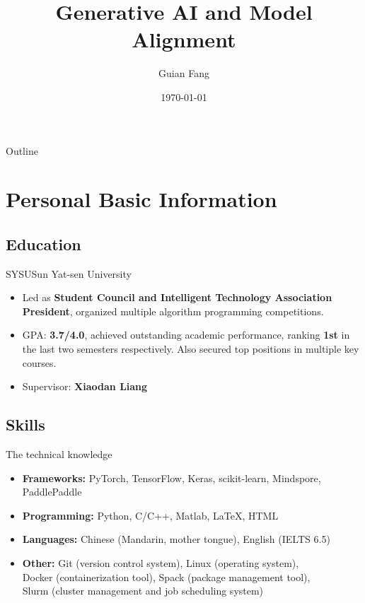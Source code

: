 \documentclass[8pt]{beamer}
\title[National University of Singapore]{\textbf{Generative AI and Model Alignment}}
\author[Guian Fang]{Guian Fang}
\institute[fanggan@mail2.sysu.edu.cn]{National University of Singapore}
\date[ECE interview]{\today}
\begin{document}
\frame{\titlepage}

\begin{frame}{Outline}
  \tableofcontents
\end{frame}
\section{Personal Basic Information}

\subsection{Education}
\begin{frame}{SYSU}{Sun Yat-sen University}
  \begin{itemize}
  \item {
    Led as \textbf{Student Council and Intelligent Technology Association President}, organized multiple algorithm programming competitions.
  }
  \item {
    GPA: \textbf{3.7/4.0}, achieved outstanding academic performance, ranking \textbf{1st} in the last two semesters respectively. Also secured top positions in multiple key courses.
  }
  \item {Supervisor: \textbf{Xiaodan Liang}}
  \end{itemize}
\end{frame}

\subsection{Skills}
\begin{frame}{The technical knowledge}
  \begin{itemize}
  \item
    \textbf{Frameworks:} %
    {PyTorch, TensorFlow, Keras, scikit-learn, Mindspore, PaddlePaddle} %


  \item
    \textbf{Programming:} %
    {Python, C/C++, Matlab, LaTeX, HTML} %

  \item
    \textbf{Languages:} %
    {Chinese (Mandarin, mother tongue), English (IELTS 6.5)} %

      \item
    \textbf{Other:} %
    {Git (version control system), Linux (operating system),\\ Docker (containerization tool), Spack (package management tool),\\ Slurm (cluster management and job scheduling system)} %
  \end{itemize}
\end{frame}
\end{document}
